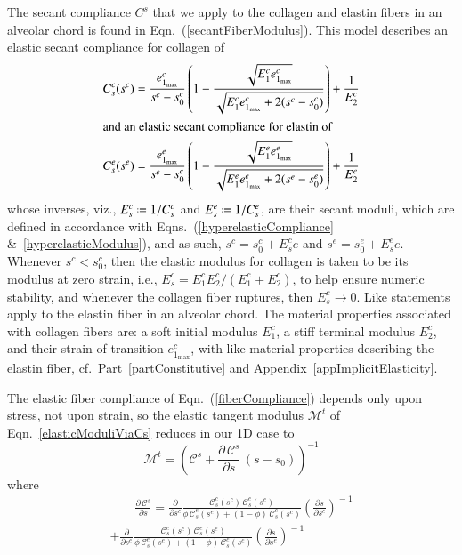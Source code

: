 The secant compliance $C^s$ that we apply to the collagen and elastin fibers in an alveolar chord is found in Eqn.~(\ref{secantFiberModulus}).  This model describes an elastic secant compliance for collagen of
\begin{subequations}
    \label{fiberCompliance}
    \begin{align}
    C_s^c (s^c) & = \frac{e^c_{1_{\max}}}{s^c - s^c_0} \left( 
    1 - \frac{\sqrt{E^c_1 e^c_{1_{\max}}}}{\sqrt{E^c_1 e^c_{1_{\max}} + 
            2 (s^c - s^c_0)}} \right) + \frac{1}{E^c_2} \\
    \intertext{and an elastic secant compliance for elastin of}
    C_s^e (s^e) & = \frac{e^e_{1_{\max}}}{s^e - s^e_0} \left( 
    1 - \frac{\sqrt{E^e_1 e^e_{1_{\max}}}}{\sqrt{E^e_1 e^e_{1_{\max}} + 
            2 (s^e - s^e_0)}} \right) + \frac{1}{E^e_2}
    \end{align}
\end{subequations}
whose inverses, viz., $E^c_s \defeq 1 / C^c_s$ and $E^e_s \defeq 1 / C^e_s$, are their secant moduli, which are defined in accordance with Eqns.~(\ref{hyperelasticCompliance} \&\ \ref{hyperelasticModulus}), and as such, $s^c = s_0^c + E^c_s e$ and $s^e = s_0^e + E^e_s e$.  Whenever $s^c < s^c_0$, then the elastic modulus for collagen is taken to be its modulus at zero strain, i.e., $E^c_s = E^c_1 E^c_2 / ( E^c_1 + E^c_2 )$, to help ensure numeric stability, and whenever the collagen fiber ruptures, then $E^c_s \to 0$.  Like statements apply to the elastin fiber in an alveolar chord.  The material properties associated with collagen fibers are: a soft initial modulus $E^c_1$, a stiff terminal modulus $E^c_2$, and their strain of transition $e^c_{1_{\max}}$, with like material properties describing the elastin fiber, cf.\ Part~\ref{partConstitutive} and Appendix~\ref{appImplicitElasticity}.

The elastic fiber compliance of Eqn.~(\ref{fiberCompliance}) depends only upon stress, not upon strain, so the elastic tangent modulus $\boldsymbol{\mathcal{M}}^t$ of Eqn.~\eqref{elasticModuliViaCs} reduces in our 1D case to
\begin{equation}
    \mathcal{M}^t = \left( \mathcal{C}^s + \frac{\partial \, \mathcal{C}^s}
    {\partial s} \, (s - s_0) \right)^{-1}
\end{equation}
where
\begin{multline*}
    \mbox{} \qquad \frac{\partial \, \mathcal{C}^s}{\partial s} = 
    \frac{\partial}{\partial s^c} 
    \frac{\mathcal{C}_s^c (s^c) \, \mathcal{C}_s^e (s^e)}
    {\phi \, \mathcal{C}_s^e (s^e) + (1-\phi) \, \mathcal{C}_s^c (s^c)}
    \left( \frac{\partial s}{\partial s^c} \right)^{\! -1} \\ +
    \frac{\partial}{\partial s^e} 
    \frac{\mathcal{C}_s^c (s^c) \, \mathcal{C}_s^e (s^e)} 
    {\phi \, \mathcal{C}_s^e (s^e) + (1-\phi) \, \mathcal{C}_s^c (s^c)}
    \left( \frac{\partial s}{\partial s^e} \right)^{\! -1} \qquad \mbox{}
\end{multline*}

